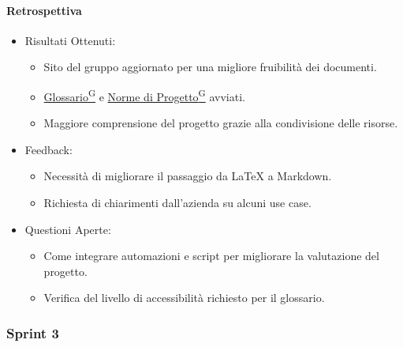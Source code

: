 \documentclass{article}
\begin{document}
                \paragraph{Retrospettiva}
                \begin{itemize}
                    \item Risultati Ottenuti:
                        \begin{itemize}
                            \item Sito del gruppo aggiornato per una migliore fruibilità dei documenti.
                            \item \href{https://code7crusaders.github.io/docs/RTB/documentazione_interna/glossario.html#glossario}{Glossario\textsuperscript{G}} e \href{https://code7crusaders.github.io/docs/RTB/documentazione_interna/glossario.html#norme-di-progetto}{Norme di Progetto\textsuperscript{G}} avviati.
                            \item Maggiore comprensione del progetto grazie alla condivisione delle risorse.
                        \end{itemize}
                    \item Feedback:
                        \begin{itemize}
                            \item Necessità di migliorare il passaggio da LaTeX a Markdown.
                            \item Richiesta di chiarimenti dall'azienda su alcuni use case.
                        \end{itemize}
                    \item Questioni Aperte:
                        \begin{itemize}
                            \item Come integrare automazioni e script per migliorare la valutazione del progetto.
                            \item Verifica del livello di accessibilità richiesto per il glossario.
                        \end{itemize}
                \end{itemize}
            \subsubsection{Sprint 3}
\end{document}
